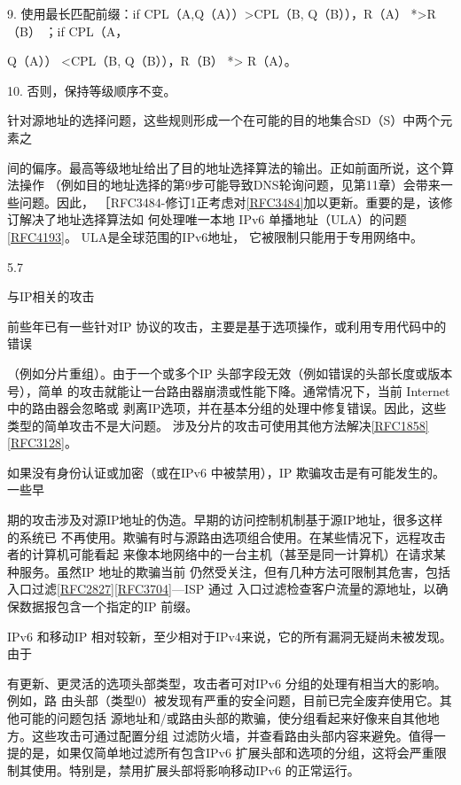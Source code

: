 9. 使用最长匹配前缀：if CPL（A,Q（A））>CPL（B, Q（B）），R（A） *>R（B） ；if CPL（A，

Q（A）） <CPL（B, Q（B）），R（B） *> R（A）。

10. 否则，保持等级顺序不变。

针对源地址的选择问题，这些规则形成一个在可能的目的地集合SD（S）中两个元素之

间的偏序。最高等级地址给出了目的地址选择算法的输出。正如前面所说，这个算法操作
（例如目的地址选择的第9步可能导致DNS轮询问题，见第11章）会带来一些问题。因此，
［RFC3484-修订1正考虑对\href{https://www.rfc-editor.org/rfc/rfc3484}{[RFC3484]}加以更新。重要的是，该修订解决了地址选择算法如
何处理唯一本地 IPv6 单播地址（ULA）的问题\href{https://www.rfc-editor.org/rfc/rfc4193}{[RFC4193]}。 ULA是全球范围的IPv6地址，
它被限制只能用于专用网络中。

5.7

与IP相关的攻击

前些年已有一些针对IP 协议的攻击，主要是基于选项操作，或利用专用代码中的错误

（例如分片重组）。由于一个或多个IP 头部字段无效（例如错误的头部长度或版本号），简单
的攻击就能让一台路由器崩溃或性能下降。通常情况下，当前 Internet 中的路由器会忽略或
剥离IP选项，并在基本分组的处理中修复错误。因此，这些类型的简单攻击不是大问题。
涉及分片的攻击可使用其他方法解决\href{https://www.rfc-editor.org/rfc/rfc1858}{[RFC1858]} \href{https://www.rfc-editor.org/rfc/rfc3128}{[RFC3128]}。

如果没有身份认证或加密（或在IPv6 中被禁用），IP 欺骗攻击是有可能发生的。一些早

期的攻击涉及对源IP地址的伪造。早期的访问控制机制基于源IP地址，很多这样的系统已
不再使用。欺骗有时与源路由选项组合使用。在某些情况下，远程攻击者的计算机可能看起
来像本地网络中的一台主机（甚至是同一计算机）在请求某种服务。虽然IP 地址的欺骗当前
仍然受关注，但有几种方法可限制其危害，包括入口过滤\href{https://www.rfc-editor.org/rfc/rfc2827}{[RFC2827]}\href{https://www.rfc-editor.org/rfc/rfc3704}{[RFC3704]}—ISP 通过
入口过滤检查客户流量的源地址，以确保数据报包含一个指定的IP 前缀。

IPv6 和移动IP 相对较新，至少相对于IPv4来说，它的所有漏洞无疑尚未被发现。由于

有更新、更灵活的选项头部类型，攻击者可对IPv6 分组的处理有相当大的影响。例如，路
由头部（类型0）被发现有严重的安全问题，目前已完全废弃使用它。其他可能的问题包括
源地址和/或路由头部的欺骗，使分组看起来好像来自其他地方。这些攻击可通过配置分组
过滤防火墙，并查看路由头部内容来避免。值得一提的是，如果仅简单地过滤所有包含IPv6
扩展头部和选项的分组，这将会严重限制其使用。特别是，禁用扩展头部将影响移动IPv6
的正常运行。

